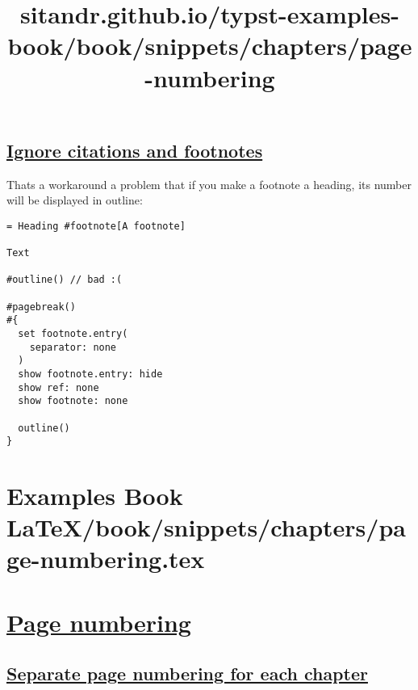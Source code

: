 \pandocbounded{}

\subsection{\texorpdfstring{\hyperref[ignore-citations-and-footnotes]{Ignore
citations and
footnotes}}{Ignore citations and footnotes}}\label{ignore-citations-and-footnotes}

That\textquotesingle s a workaround a problem that if you make a
footnote a heading, its number will be displayed in outline:

\begin{verbatim}
= Heading #footnote[A footnote]

Text

#outline() // bad :(

#pagebreak()
#{
  set footnote.entry(
    separator: none
  )
  show footnote.entry: hide
  show ref: none
  show footnote: none

  outline()
}
\end{verbatim}

\pandocbounded{}

\pandocbounded{}


\section{Examples Book LaTeX/book/snippets/chapters/page-numbering.tex}
\title{sitandr.github.io/typst-examples-book/book/snippets/chapters/page-numbering}

\section{\texorpdfstring{\hyperref[page-numbering]{Page
numbering}}{Page numbering}}\label{page-numbering}

\subsection{\texorpdfstring{\hyperref[separate-page-numbering-for-each-chapter]{Separate
page numbering for each
chapter}}{Separate page numbering for each chapter}}\label{separate-page-numbering-for-each-chapter}

